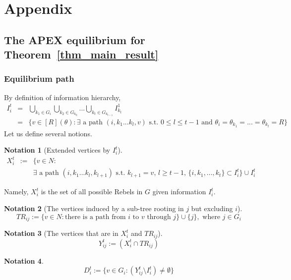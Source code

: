 \documentclass[12pt,letter]{article}
\newtheorem{notation}{Notation}[section]
\theoremstyle{definition}
\theoremstyle{remark}
\theoremstyle{claim}
\begin{document}


\appendix
\section{Appendix}
\subsection{The APEX equilibrium for Theorem~\ref{thm_main_result}}
\subsubsection{Equilibrium path}
\label{sec:equilibrium_path}
By definition of information hierarchy, 
\begin{eqnarray*}
I^t_i & = & \bigcup_{k_1\in G_i}\bigcup_{k_2\in G_{k_0}}...\bigcup_{k_{t}\in G_{k_{t-1}}}I^1_{k_{t}}\\
&= & \{v\in [R](\theta): \text{$\exists$ a path $(i,k_1...k_{l},v)$ s.t.~$0\leq l\leq t-1$ and $\theta_i=\theta_{k_1}=...=\theta_{k_l}=R$}\}
\end{eqnarray*}
Let us define several notions.
\begin{notation}[Extended vertices by $I^t_i$]
\label{def:ext_tree}
\begin{eqnarray*}
X^t_i & := &  \{v\in N: \\
	& & \text{$\exists$ a path $(i,k_1...k_{l},k_{l+1})$ s.t.~$k_{l+1}=v$, $l\geq t-1$, $\{i,k_1,...,k_{t}\}\subset I^t_i$}\}\cup I^t_i
\end{eqnarray*}
\end{notation}
Namely, $X^t_i $ is the set of all possible Rebels in $G$ given information $I^t_i$. 

\begin{notation}[The vertices induced by a sub-tree rooting in $j$ but excluding $i$]
\[TR_{ij}:= \{v\in N:\text{there is a path from $i$ to $v$ through $j$}\}\cup\{j\},\text{ where $j\in G_i$}\]
\end{notation}


\begin{notation}[The vertices that are in $X^t_i$ and $TR_{ij}$]
\[Y^t_{ij}:= (X^t_i\cap TR_{ij})\]
\end{notation}


\begin{notation}
\[D^t_{i}:= \{v\in G_i: (Y^t_{ij}\setminus I^t_i)\neq \emptyset\}\]
\end{notation}
\end{document}

